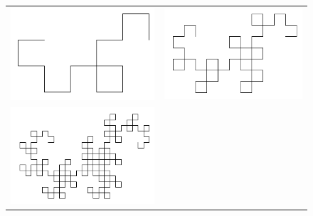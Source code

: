 \documentclass[a4paper, 11pt]{book}
\begin{document}
\begin{figure}
\label{figure-dragon}
\centering
\begin{tabular}{cc}
\includegraphics[scale=0.4]{dragon-4.png} & 
\includegraphics[scale=0.4]{dragon-6.png} \\
\includegraphics[scale=0.4]{dragon-8.png} & 

\end{tabular}
\end{figure}
\end{document}
